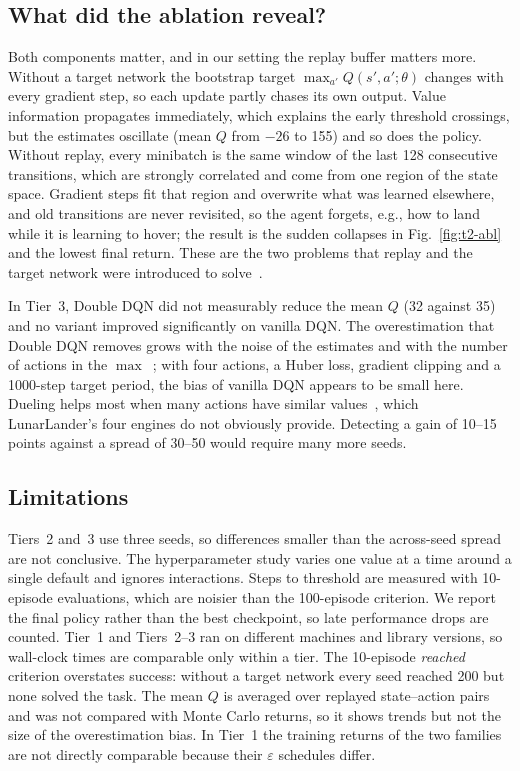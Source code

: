 \documentclass[conference]{IEEEtran}
\begin{document}
\subsection{What did the ablation reveal?}
Both components matter, and in our setting the replay buffer matters more. Without a target
network the bootstrap target $\max_{a'}Q(s',a';\theta)$ changes with every gradient step,
so each update partly chases its own output. Value information propagates immediately, which
explains the early threshold crossings, but the estimates oscillate (mean $Q$ from $-26$ to
155) and so does the policy. Without replay, every minibatch is the same window of the last
128 consecutive transitions, which are strongly correlated and come from one region of the
state space. Gradient steps fit that region and overwrite what was learned elsewhere, and
old transitions are never revisited, so the agent forgets, e.g., how to land while it is
learning to hover; the result is the sudden collapses in Fig.~\ref{fig:t2-abl} and the
lowest final return. These are the two problems that replay and the target network were
introduced to solve~\cite{mnih2015}.

In Tier~3, Double DQN did not measurably reduce the mean $Q$ (32 against 35) and no variant
improved significantly on vanilla DQN. The overestimation that Double DQN removes grows
with the noise of the estimates and with the number of actions in the
$\max$~\cite{vanhasselt2016}; with four actions, a Huber loss, gradient clipping and a
1000-step target period, the bias of vanilla DQN appears to be small here. Dueling helps
most when many actions have similar values~\cite{wang2016}, which LunarLander's four
engines do not obviously provide. Detecting a gain of 10--15 points against a spread of
30--50 would require many more seeds.

\subsection{Limitations}
Tiers~2 and~3 use three seeds, so differences smaller than the across-seed spread are not
conclusive. The hyperparameter study varies one value at a time around a single default
and ignores interactions. Steps to threshold are measured with 10-episode evaluations,
which are noisier than the 100-episode criterion. We report the final policy rather than
the best checkpoint, so late performance drops are counted. Tier~1 and Tiers~2--3 ran on
different machines and library versions, so wall-clock times are comparable only within a
tier. The 10-episode \emph{reached} criterion overstates success: without a target network
every seed reached 200 but none solved the task. The mean $Q$ is averaged over replayed
state--action pairs and was not compared with Monte Carlo returns, so it shows trends but
not the size of the overestimation bias. In Tier~1 the training returns of the two
families are not directly comparable because their $\varepsilon$ schedules differ.
\end{document}
